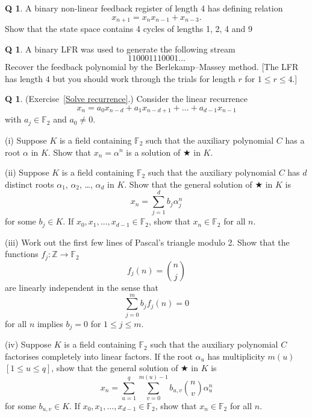 \documentclass[12pt,a4paper]{article}
\theoremstyle{plain}
\theoremstyle{definition}
\newtheorem{question}[theorem]{Q}
\begin{document}
    \begin{question}
        \label{C4.2}
        A binary non-linear feedback register of length 4
        has defining relation
        \[x_{n+1}=x_{n}x_{n-1}+x_{n-3}.\]
        Show that the state space contains 4 cycles of lengths
        1, 2, 4 and 9
    \end{question}
    \begin{question}
        \label{C4.3}
        A binary LFR was used to generate
        the following stream
        \[110001110001\dots\]
        Recover the feedback polynomial by the Berlekamp--Massey
        method. [The LFR has length $4$ but you should work through
        the trials for length $r$ for $1\leq r\leq 4$.]
    \end{question}
    \begin{question}
        \label{C4.4}
        (Exercise~\ref{Solve recurrence}.)
        Consider the linear recurrence
        \begin{equation*}
            x_{n}=a_{0}x_{n-d}+a_{1}x_{n-d+1}+\ldots+a_{d-1}x_{n-1}\tag*{$\bigstar$}
        \end{equation*}
        with $a_{j}\in {\mathbb F}_{2}$ and $a_{0}\neq 0$.

        (i) Suppose $K$ is a field containing ${\mathbb F}_{2}$
        such that the auxiliary polynomial $C$ has a root $\alpha$
        in $K$. Show that $x_{n}=\alpha^{n}$ is a solution of $\bigstar$ in $K$.

        (ii) Suppose $K$ is a field containing ${\mathbb F}_{2}$
        such that the auxiliary polynomial $C$ has
        $d$ distinct roots $\alpha_{1}$, $\alpha_{2}$,
        \dots, $\alpha_{d}$ in $K$. Show that the general solution
        of $\bigstar$ in $K$ is
        \[x_{n}=\sum_{j=1}^{d}b_{j}\alpha_{j}^{n}\]
        for some $b_{j}\in K$.
        If $x_{0},x_{1},\dots,x_{d-1}\in {\mathbb F}_{2}$,
        show that $x_{n}\in {\mathbb F}_{2}$ for all $n$.

        (iii) Work out the first few lines of Pascal's triangle
        modulo 2. Show that the functions
        $f_{j}:{\mathbb Z}\rightarrow{\mathbb F}_{2}$
        \[f_{j}(n)=\binom{n}{j}\]
        are linearly independent in the sense that
        \[\sum_{j=0}^{m}b_{j}f_{j}(n)=0\]
        for all $n$ implies $b_{j}=0$ for $1\leq j\leq m$.

        (iv) Suppose $K$ is a field containing ${\mathbb F}_{2}$
        such that the auxiliary polynomial $C$ factorises
        completely into linear factors. If the
        root $\alpha_{u}$ has multiplicity $m(u)$ $[1\leq u\leq q]$,
        show that the general solution
        of $\bigstar$ in $K$ is
        \[x_{n}=\sum_{u=1}^{q}\sum_{v=0}^{m(u)-1}
        b_{u,v}\binom{n}{v}\alpha_{u}^{n}\]
        for some $b_{u,v}\in K$.
        If $x_{0},x_{1},\dots,x_{d-1}\in {\mathbb F}_{2}$,
        show that $x_{n}\in {\mathbb F}_{2}$ for all $n$.
    \end{question}
\end{document}
